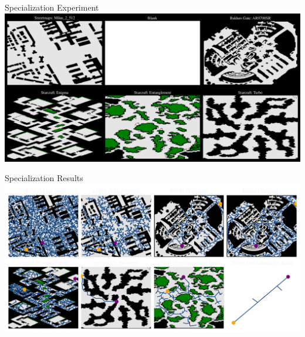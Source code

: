 \documentclass[aspectratio=169]{beamer}
\begin{document}
\begin{frame}{Specialization Experiment}
    \centering
    \includegraphics[width=1.0\linewidth, keepaspectratio]{figures/show_maps_exp.pdf}
\end{frame}

\begin{frame}{Specialization Results}
    \includegraphics[width=1.0\linewidth, keepaspectratio]{figures/learned.pdf}
\end{frame}
\end{document}
